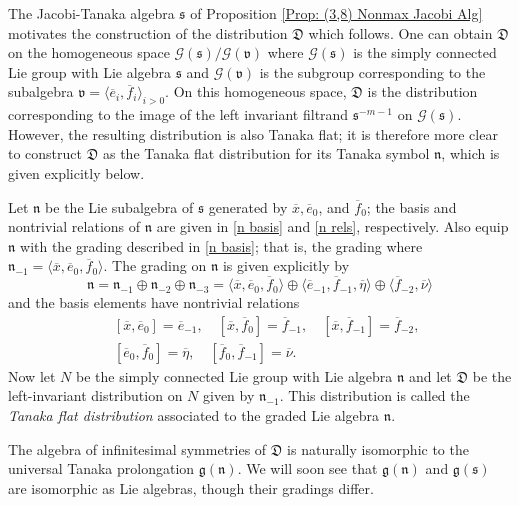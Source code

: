 \documentclass[11pt,letterpaper]{amsart}
\numberwithin{equation}{section}
\newcommand{\oline}{\overline}
\begin{document}
The Jacobi-Tanaka algebra $\mathfrak s$ of Proposition \ref{Prop: (3,8) Nonmax Jacobi Alg} motivates the construction of the distribution $\mathfrak D$ which follows. One can obtain $\mathfrak D$ on the homogeneous space $\mathcal G(\mathfrak s)/\mathcal{G}(\mathfrak v)$ where $\mathcal G(\mathfrak s)$ is the simply connected Lie group with Lie algebra $\mathfrak{s}$ and $\mathcal G(\mathfrak v)$ is the subgroup corresponding to the subalgebra $\mathfrak v = \langle \oline e_i,\oline f_i\rangle_{i>0}$. On this homogeneous space, $\mathfrak D$ is the distribution corresponding to the image of the left invariant filtrand $\mathfrak s^{-m-1}$ on $\mathcal G(\mathfrak s)$. However, the resulting distribution is also Tanaka flat; it is therefore more clear to construct $\mathfrak D$ as the Tanaka flat distribution for its Tanaka symbol $\mathfrak n$, which is given explicitly below.

Let $\mathfrak{n}$ be the Lie subalgebra of $\mathfrak s$ generated by $\oline x, \oline e_0$, and $ \oline f_0$; the basis and nontrivial relations of $\mathfrak n$ are given in \eqref{n basis} and \eqref{n rels}, respectively. Also equip $\mathfrak n$ with the grading described in \eqref{n basis}; that is, the grading where $\mathfrak n_{-1} = \langle \oline x, \oline e_0, \oline f_0\rangle$. The grading on $\mathfrak{n}$ is given explicitly by 
\begin{equation}
    \mathfrak{n} = \mathfrak{n}_{-1}\oplus\mathfrak{n}_{-2}\oplus\mathfrak{n}_{-3} = \langle \oline x,\oline e_0, \oline f_0\rangle \oplus \langle \oline e_{-1},\oline f_{-1},\oline \eta\rangle \oplus \langle \oline f_{-2},\oline \nu\rangle
\end{equation}
and the basis elements have nontrivial relations
\begin{eqnarray}
    ~&[\oline x, \oline e_0] = \oline e_{-1},\quad [\oline x, \oline f_{0}] = \oline f_{-1},\quad [\oline x, \oline f_{-1}] = \oline f_{-2},\\
    ~&[\oline e_0, \oline f_0]=\oline\eta,\quad [\oline f_0, \oline f_{-1}]=\oline\nu.
\end{eqnarray}
Now let $N$ be the simply connected Lie group with Lie algebra $\mathfrak{n}$ and let $\mathfrak{D}$ be the left-invariant distribution on $N$ given by $\mathfrak{n}_{-1}$. This distribution is called the \textit{Tanaka flat distribution} associated to the graded Lie algebra $\mathfrak{n}$.

The algebra of infinitesimal symmetries of $\mathfrak{D}$ is naturally isomorphic to the universal Tanaka prolongation $\mathfrak{g}(\mathfrak{n})$. We will soon see that $\mathfrak{g}(\mathfrak{n})$ and $\mathfrak g(\mathfrak s)$ are isomorphic as Lie algebras, though their gradings differ.
\end{document}
